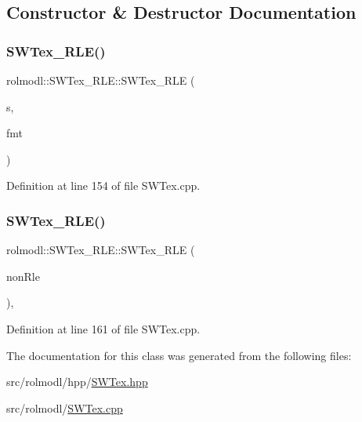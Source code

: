 \subsection{Constructor \& Destructor Documentation}
\mbox{\label{classrolmodl_1_1_s_w_tex___r_l_e_a1895097431164ea0c840f465d6c7d006}} 
\subsubsection{\texorpdfstring{SWTex\_RLE()}{SWTex\_RLE()}\hspace{0.1cm}{\footnotesize\ttfamily [1/2]}}
{\footnotesize\ttfamily rolmodl\+::\+S\+W\+Tex\+\_\+\+R\+L\+E\+::\+S\+W\+Tex\+\_\+\+R\+LE (\begin{DoxyParamCaption}\item[{const \mbox{\hyperlink{structrolmodl_1_1geom_1_1_size}{geom\+::\+Size}}}]{s,  }\item[{const \mbox{\hyperlink{namespacerolmodl_1_1pixelfmt_a96282713e4465ba9211c8fd3a702b52b}{pixelfmt\+::\+Id}}}]{fmt }\end{DoxyParamCaption})}



Definition at line 154 of file S\+W\+Tex.\+cpp.

\mbox{\label{classrolmodl_1_1_s_w_tex___r_l_e_a13818d825e237cdf77ed7e0687642d3c}} 
\subsubsection{\texorpdfstring{SWTex\_RLE()}{SWTex\_RLE()}\hspace{0.1cm}{\footnotesize\ttfamily [2/2]}}
{\footnotesize\ttfamily rolmodl\+::\+S\+W\+Tex\+\_\+\+R\+L\+E\+::\+S\+W\+Tex\+\_\+\+R\+LE (\begin{DoxyParamCaption}\item[{\mbox{\hyperlink{classrolmodl_1_1_s_w_tex}{S\+W\+Tex}} \&\&}]{non\+Rle }\end{DoxyParamCaption})\hspace{0.3cm}{\ttfamily [explicit]}, {\ttfamily [noexcept]}}



Definition at line 161 of file S\+W\+Tex.\+cpp.



The documentation for this class was generated from the following files\+:\begin{DoxyCompactItemize}
\item 
src/rolmodl/hpp/\mbox{\hyperlink{_s_w_tex_8hpp}{S\+W\+Tex.\+hpp}}\item 
src/rolmodl/\mbox{\hyperlink{_s_w_tex_8cpp}{S\+W\+Tex.\+cpp}}\end{DoxyCompactItemize}
